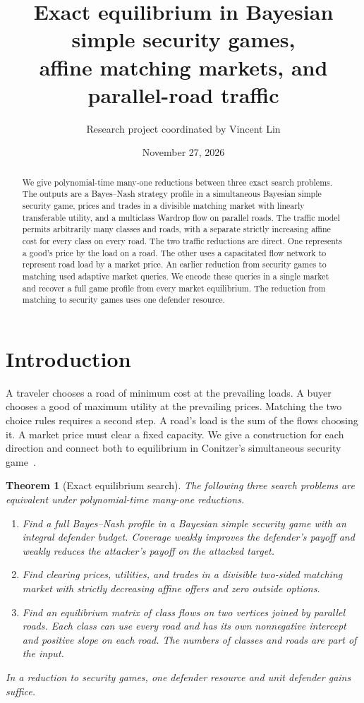 \documentclass[11pt]{article}
\title{Exact equilibrium in Bayesian simple security games,\\
affine matching markets, and parallel-road traffic}
\author{Research project coordinated by Vincent Lin}
\date{November 27, 2026}
\newtheorem{theorem}{Theorem}[section]
\begin{document}
\maketitle
\begin{abstract}
We give polynomial-time many-one reductions between three exact search
problems. The outputs are a Bayes--Nash strategy profile in a simultaneous
Bayesian simple security game, prices and trades in a divisible matching
market with linearly transferable utility, and a multiclass Wardrop flow
on parallel roads. The traffic model permits arbitrarily many classes and
roads, with a separate strictly increasing affine cost for every class on
every road. The two traffic reductions are direct. One represents a good's
price by the load on a road. The other uses a capacitated flow network to
represent road load by a market price. An earlier reduction from security
games to matching used adaptive market queries. We encode these queries
in a single market and recover a full game profile from every market
equilibrium. The reduction from matching to security games uses one
defender resource.
\end{abstract}

\section{Introduction}\label{sec:intro}
A traveler chooses a road of minimum cost at the prevailing loads. A buyer
chooses a good of maximum utility at the prevailing prices. Matching the
two choice rules requires a second step. A road's load is the sum of the
flows choosing it. A market price must clear a fixed capacity. We give a
construction for each direction and connect both to equilibrium in
Conitzer's simultaneous security game~\cite{conitzer}.

\begin{theorem}[Exact equilibrium search]\label{thm:traffic}
The following three search problems are equivalent under polynomial-time
many-one reductions.
\begin{enumerate}
\item Find a full Bayes--Nash profile in a Bayesian simple security game
with an integral defender budget. Coverage weakly improves the defender's
payoff and weakly reduces the attacker's payoff on the attacked target.
\item Find clearing prices, utilities, and trades in a divisible two-sided
matching market with strictly decreasing affine offers and zero outside
options.
\item Find an equilibrium matrix of class flows on two vertices joined by parallel
roads. Each class can use every road and has its own nonnegative intercept
and positive slope on each road. The numbers of classes and roads are
part of the input.
\end{enumerate}
In a reduction to security games, one defender resource and unit defender
gains suffice.
\end{theorem}
\end{document}
